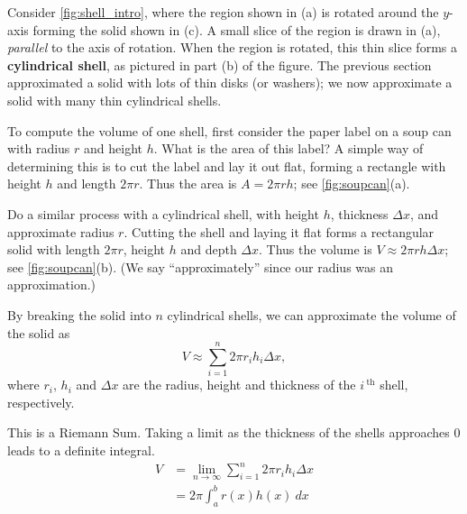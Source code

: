 Consider \autoref{fig:shell_intro}, where the region shown in (a) is rotated around the $y$-axis forming the solid shown in (c). A small slice of the region is drawn in (a), \emph{parallel} to the axis of rotation. When the region is rotated, this thin slice forms a \textbf{cylindrical shell}, as pictured in part (b) of the figure. The previous section approximated a solid with lots of thin disks (or washers); we now approximate a solid with many thin cylindrical shells.

To compute the volume of one shell, first consider the paper label on a soup can with radius $r$ and height $h$. What is the area of this label? A simple way of determining this is to cut the label and lay it out flat, forming a rectangle with height $h$ and length $2\pi r$. Thus the area is $A = 2\pi rh$; see \autoref{fig:soupcan}(a).

Do a similar process with a cylindrical shell, with height $h$, thickness $\Delta x$, and approximate radius $r$. Cutting the shell and laying it flat forms a rectangular solid with length $2\pi r$, height $h$ and depth $\Delta x$. Thus the volume is $V \approx 2\pi rh\Delta x$; see \autoref{fig:soupcan}(b). (We say ``approximately'' since our radius was an approximation.)

By breaking the solid into $n$ cylindrical shells, we can approximate the volume of the solid as
\[V \approx \sum_{i=1}^n 2\pi r_ih_i\Delta x,\]
where $r_i$, $h_i$ and $\Delta x$ are the radius, height and thickness of the $i\,^\text{th}$ shell, respectively. 

This is a Riemann Sum. Taking a limit as the thickness of the shells approaches 0 leads to a definite integral.
\begin{align*}
V&=\lim_{n\to \infty} \sum_{i=1}^n 2\pi r_i h_i \Delta x\\
&=2\pi \int_a^b r(x)h(x)\ dx
\end{align*}

